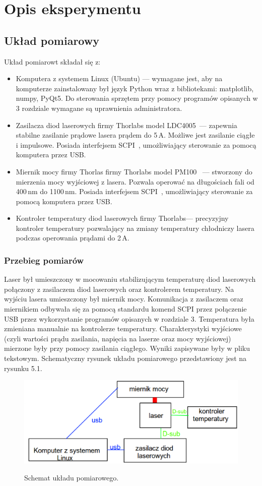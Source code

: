 \chapter{Opis eksperymentu}
\section{Układ pomiarowy}
Układ pomiarowt składał się z:
\begin{itemize}
\item Komputera z systemem Linux (Ubuntu) --- wymagane jest, aby na komputerze zainstalowany był język Python wraz z bibliotekami:
matplotlib, numpy, PyQt5. Do sterowania sprzętem przy pomocy programów opisanych w 3 rozdziale wymagane są uprawnienia administratora.
\item Zasilacza diod laserowych firmy Thorlabs model LDC4005~\cite{Ldc_book}--- zapewnia stabilne zasilanie prądowe lasera prądem do 5\,A.
Możliwe jest zasilanie ciągłe i impulsowe. Posiada interfejsem SCPI~\cite{Ldc_book_prog}, umożliwiający sterowanie za pomocą komputera przez USB.
\item Miernik mocy firmy Thorlas firmy Thorlabs model PM100~\cite{Pm100_book} --- stworzony do mierzenia mocy wyjściowej z lasera. Pozwala operować na
długościach fali od 400\,nm do 1100\,nm. Posiada interfejsem SCPI~\cite{Pm100_book}, umożliwiający sterowanie za pomocą komputera przez USB.
\item Kontroler temperatury diod laserowych firmy Thorlabs--- precyzyjny kontroler temperatury pozwalający na zmiany temperatury
chłodniczy lasera podczas operowania prądami do 2\,A.
\end{itemize}
\subsection{Przebieg pomiarów}
Laser był umieszczony w mocowaniu stabilizującym temperaturę diod laserowych połączony z zasilaczem diod laserowych oraz kontrolerem temperatury.
Na wyjściu lasera umieszczony był miernik mocy. Komunikacja z zasilaczem oraz miernikiem odbywała się za pomocą standardu
komend SCPI przez połączenie USB przez wykorzystanie programów opisanych w rozdziale 3.
Temperatura była zmieniana manualnie na kontrolerze temperatury.
Charakterystyki wyjściowe (czyli wartości prądu zasilania, napięcia na laserze oraz mocy wyjściowej)
mierzone były przy pomocy zasilania ciągłego. Wyniki zapisywane były w pliku tekstowym. Schematyczny rysunek układu pomiarowego przedstawiony jest
na rysunku 5.1.
\begin{figure}
\center
\includegraphics[scale=0.35]{schemat.eps}
\label{fig:sch_pom}
\caption{Schemat układu pomiarowego.}
\end{figure}